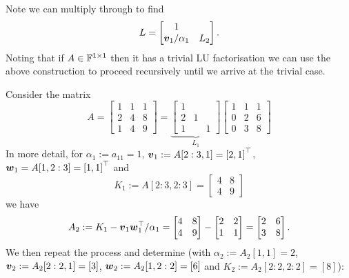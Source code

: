 Note we can multiply through to find
\[
L = \begin{bmatrix}
1 \\
\bm{{\mbox{\boldmath$v$\unboldmath}}}_1/\alpha_1 & L_2 \end{bmatrix}.
\]
Noting that if $A \in {\mathbb F}^{1 \times 1}$ then it has a trivial LU factorisation we can use the above construction to proceed recursively until we arrive at the trivial case.

\begin{example}[LU by-hand] Consider the matrix
\[
A = \begin{bmatrix} 1 & 1 & 1 \\
                    2 & 4 & 8 \\
                    1 & 4 & 9
                    \end{bmatrix} = \underbrace{\begin{bmatrix} 1  \\
                    2 & 1 &  \\
                    1 &  & 1
                    \end{bmatrix}}_{L_1} \begin{bmatrix} 1 & 1 & 1 \\
                    0 & 2 & 6 \\
                    0 & 3 & 8
                    \end{bmatrix}
\]
In more detail, for $\ensuremath{\alpha}_1 := a_{11} = 1$, $\ensuremath{\bm{\v}}_1 := A[2:3,1] = \vectt[2,1]$, $\ensuremath{\bm{\w}}_1 = A[1,2:3] = \vectt[1,1]$ and
\[
K_1 := A[2:3,2:3] = \begin{bmatrix} 4 & 8 \\ 4 & 9 \end{bmatrix}
\]
we have
\[
A_2 := K_1 -\bm{{\mbox{\boldmath$v$\unboldmath}}}_1\bm{{\mbox{\boldmath$w$\unboldmath}}}_1^\top /\alpha_1 = \begin{bmatrix} 4 & 8 \\ 4 & 9 \end{bmatrix} - \begin{bmatrix} 2 & 2 \\ 1 & 1 \end{bmatrix} = \begin{bmatrix} 2 & 6 \\ 3 & 8 \end{bmatrix}.
\]
We then repeat the process and determine (with $\ensuremath{\alpha}_2 := A_2[1,1] = 2$, $\bm{{\mbox{\boldmath$v$\unboldmath}}}_2 := A_2[2:2,1] = [3]$, $\bm{{\mbox{\boldmath$w$\unboldmath}}}_2 := A_2[1,2:2] = [6]$ and $K_2 := A_2[2:2,2:2] = [8]$):

\end{example}
